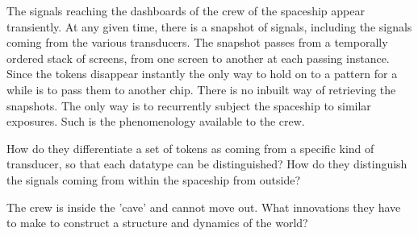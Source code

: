 The signals reaching the dashboards of the crew of the spaceship appear transiently. At any given time, there is a snapshot of signals, including the signals coming from the various transducers. The snapshot passes from a temporally ordered stack of screens, from one screen to another at each passing instance. 
Since the tokens disappear instantly the only way to hold on to a pattern for a while is to pass them to another chip. There is no inbuilt way of retrieving the snapshots. The only way is to recurrently subject the spaceship to similar exposures. Such is the phenomenology available to the crew. 

How do they differentiate a set of tokens as coming from a specific kind of transducer, so that each datatype can be distinguished?  How do they distinguish the signals coming from within the spaceship from outside?

The crew is inside the 'cave' and cannot move out.  What innovations they have to make to construct a structure and dynamics of the world?


